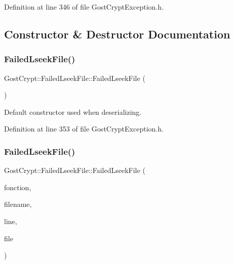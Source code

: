 Definition at line 346 of file Gost\+Crypt\+Exception.\+h.



\subsection{Constructor \& Destructor Documentation}
\mbox{\label{class_gost_crypt_1_1_failed_lseek_file_a73488da3a20d8071267b1f47e9cba861}} 
\subsubsection{\texorpdfstring{Failed\+Lseek\+File()}{FailedLseekFile()}\hspace{0.1cm}{\footnotesize\ttfamily [1/2]}}
{\footnotesize\ttfamily Gost\+Crypt\+::\+Failed\+Lseek\+File\+::\+Failed\+Lseek\+File (\begin{DoxyParamCaption}{ }\end{DoxyParamCaption})\hspace{0.3cm}{\ttfamily [inline]}}



Default constructor used when deserializing. 



Definition at line 353 of file Gost\+Crypt\+Exception.\+h.

\mbox{\label{class_gost_crypt_1_1_failed_lseek_file_aa383cc647f7958a297ca94d3b7f566b9}} 
\subsubsection{\texorpdfstring{Failed\+Lseek\+File()}{FailedLseekFile()}\hspace{0.1cm}{\footnotesize\ttfamily [2/2]}}
{\footnotesize\ttfamily Gost\+Crypt\+::\+Failed\+Lseek\+File\+::\+Failed\+Lseek\+File (\begin{DoxyParamCaption}\item[{Q\+String}]{fonction,  }\item[{Q\+String}]{filename,  }\item[{quint32}]{line,  }\item[{Q\+File\+Info}]{file }\end{DoxyParamCaption})\hspace{0.3cm}{\ttfamily [inline]}}



